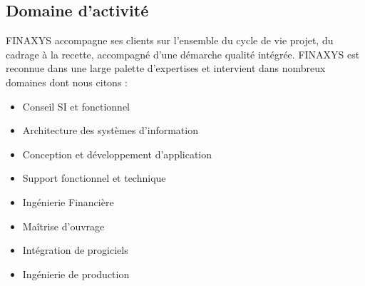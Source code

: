 \subsection{Domaine d'activité}
FINAXYS accompagne ses clients sur l’ensemble du cycle de vie projet, du cadrage à la recette, accompagné d’une démarche qualité intégrée. FINAXYS est reconnue dans une large palette d’expertises et intervient dans nombreux domaines dont nous citons :
\begin{itemize}  
    \item Conseil SI et fonctionnel
    \item Architecture des systèmes d’information
    \item Conception et développement d’application
    \item Support fonctionnel et technique
    \item Ingénierie Financière
    \item Maîtrise d’ouvrage
    \item Intégration de progiciels
    \item Ingénierie de production
\end{itemize}

